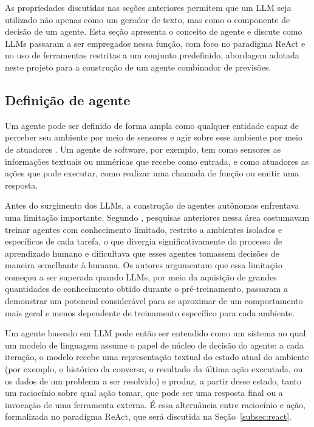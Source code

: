 As propriedades discutidas nas seções anteriores permitem que um LLM seja utilizado não apenas como um gerador de texto, mas como o componente de decisão de um agente. Esta seção apresenta o conceito de agente e discute como LLMs passaram a ser empregados nessa função, com foco no paradigma ReAct e no uso de ferramentas restritas a um conjunto predefinido, abordagem adotada neste projeto para a construção de um agente combinador de previsões.

\subsection{Definição de agente}
\label{subsec:definicao-agente}

Um agente pode ser definido de forma ampla como qualquer entidade capaz de perceber seu ambiente por meio de sensores e agir sobre esse ambiente por meio de atuadores \citep{russellnorvig2010}. Um agente de software, por exemplo, tem como sensores as informações textuais ou numéricas que recebe como entrada, e como atuadores as ações que pode executar, como realizar uma chamada de função ou emitir uma resposta.

Antes do surgimento dos LLMs, a construção de agentes autônomos enfrentava uma limitação importante. Segundo \citet{wang2023surveyagents}, pesquisas anteriores nessa área costumavam treinar agentes com conhecimento limitado, restrito a ambientes isolados e específicos de cada tarefa, o que divergia significativamente do processo de aprendizado humano e dificultava que esses agentes tomassem decisões de maneira semelhante à humana. Os autores argumentam que essa limitação começou a ser superada quando LLMs, por meio da aquisição de grandes quantidades de conhecimento obtido durante o pré-treinamento, passaram a demonstrar um potencial considerável para se aproximar de um comportamento mais geral e menos dependente de treinamento específico para cada ambiente.

Um agente baseado em LLM pode então ser entendido como um sistema no qual um modelo de linguagem assume o papel de núcleo de decisão do agente: a cada iteração, o modelo recebe uma representação textual do estado atual do ambiente (por exemplo, o histórico da conversa, o resultado da última ação executada, ou os dados de um problema a ser resolvido) e produz, a partir desse estado, tanto um raciocínio sobre qual ação tomar, que pode ser uma resposta final ou a invocação de uma ferramenta externa. É essa alternância entre raciocínio e ação, formalizada no paradigma ReAct, que será discutida na Seção~\ref{subsec:react}.


